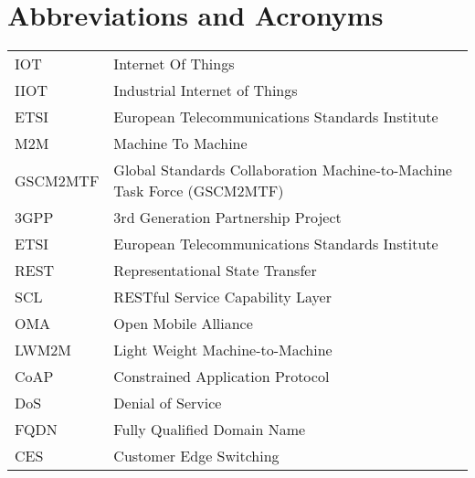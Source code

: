 \chapter*{Abbreviations and Acronyms}


\noindent
\begin{longtable}{@{}p{}p{}@{}}
IOT & Internet Of Things \\
IIOT & Industrial Internet of Things \\
ETSI & European Telecommunications Standards Institute \\
M2M & Machine To Machine \\
GSCM2MTF & Global Standards Collaboration Machine-to-Machine Task Force (GSCM2MTF) \\
3GPP & 3rd Generation Partnership Project \\ 
ETSI & European Telecommunications Standards Institute \\
REST & Representational State Transfer \\
SCL & RESTful Service Capability Layer \\
OMA & Open Mobile Alliance \\
LWM2M & Light Weight Machine-to-Machine \\
CoAP & Constrained Application Protocol \\
DoS & Denial of Service \\  
FQDN & Fully Qualified Domain Name \\
CES & Customer Edge Switching \\

\end{longtable}
